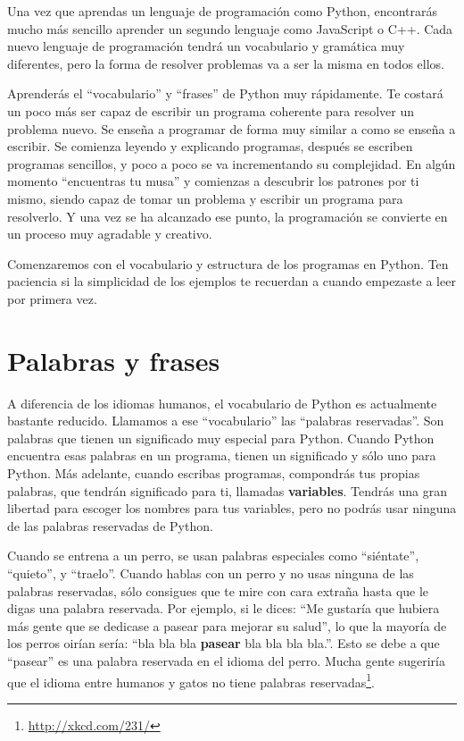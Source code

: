 Una vez que aprendas un lenguaje de programación como Python, encontrarás
mucho más sencillo aprender un segundo lenguaje como JavaScript o C++.
Cada nuevo lenguaje de programación tendrá un vocabulario y gramática muy
diferentes, pero la forma de resolver problemas
va a ser la misma en todos ellos.

Aprenderás el ``vocabulario'' y ``frases'' de Python muy rápidamente.
Te costará un poco más ser capaz de escribir un programa coherente
para resolver un problema nuevo. Se enseña a programar de forma muy similar
a como se enseña a escribir. Se comienza leyendo y explicando programas,
después se escriben programas sencillos, y poco a poco se va incrementando
su complejidad. En algún momento ``encuentras tu musa'' y comienzas
a descubrir los patrones por ti mismo, siendo capaz de tomar un
problema y escribir un programa para resolverlo. Y una vez se ha alcanzado ese
punto, la programación se convierte en un proceso muy agradable y creativo.

Comenzaremos con el vocabulario y estructura de los programas en Python. Ten
paciencia si la simplicidad de los ejemplos te recuerdan a cuando empezaste
a leer por primera vez.

\section{Palabras y frases}

A diferencia de los idiomas humanos, el vocabulario de Python es actualmente
bastante reducido. Llamamos a ese ``vocabulario'' las ``palabras reservadas''.
Son palabras que tienen un significado muy especial para Python. Cuando Python
encuentra esas palabras en un programa, tienen un significado y sólo uno para \mbox{Python}.
Más adelante, cuando escribas programas, compondrás tus propias palabras, que tendrán significado para ti, llamadas {\bf variables}. Tendrás una gran libertad para escoger los nombres para tus variables, pero no podrás usar ninguna de las palabras reservadas de Python.

Cuando se entrena a un perro, se usan palabras especiales como
``siéntate'', ``quieto'', y ``traelo''. Cuando hablas con un perro y
no usas ninguna de las palabras reservadas, sólo consigues que te mire
con cara extraña hasta que le digas una palabra reservada.
Por ejemplo, si le dices:
``Me gustaría que hubiera más gente que se dedicase a pasear para mejorar su salud'',
lo que la mayoría de los perros oirían sería:
``bla bla bla {\bf pasear} bla bla bla bla.''.
Esto se debe a que ``pasear'' es una palabra reservada en el idioma del perro.
Mucha gente sugeriría que el idioma entre humanos y gatos no tiene
palabras reservadas\footnote{\url{http://xkcd.com/231/}}.

